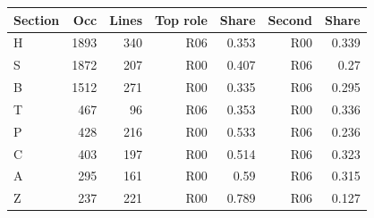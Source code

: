 {\small
\begin{tabular}{lrrrrrr}
\toprule
Section & Occ & Lines & Top role & Share & Second & Share \\
\midrule
H & 1893 & 340 & R06 & 0.353 & R00 & 0.339 \\
S & 1872 & 207 & R00 & 0.407 & R06 & 0.27 \\
B & 1512 & 271 & R00 & 0.335 & R06 & 0.295 \\
T & 467 & 96 & R06 & 0.353 & R00 & 0.336 \\
P & 428 & 216 & R00 & 0.533 & R06 & 0.236 \\
C & 403 & 197 & R00 & 0.514 & R06 & 0.323 \\
A & 295 & 161 & R00 & 0.59 & R06 & 0.315 \\
Z & 237 & 221 & R00 & 0.789 & R06 & 0.127 \\
\bottomrule
\end{tabular}
}

